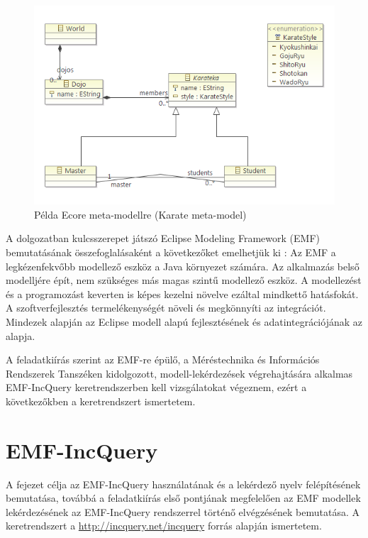 \begin{figure}[h]
\centering
\includegraphics[width=\textwidth]{figures/ecore-karate-metamodel-diag.png}
\caption{Példa Ecore meta-modellre (Karate meta-model)}
\label{fig:EcoreKarateMetaModel}
\end{figure}

A dolgozatban kulcsszerepet játszó Eclipse Modeling Framework (\gls{EMF}) bemutatásának összefoglalásaként a következőket emelhetjük ki \cite{EMFFundamentals}:
Az \gls{EMF} a legkézenfekvőbb modellező eszköz a Java környezet számára.
Az alkalmazás belső modelljére épít, nem szükséges más magas szintű modellező eszköz.
A modellezést és a programozást keverten is képes kezelni növelve ezáltal mindkettő hatásfokát.
A szoftverfejlesztés termelékenységét növeli és megkönnyíti az integrációt.
Mindezek alapján az Eclipse modell alapú fejlesztésének és adatintegrációjának az alapja. 

A feladatkiírás szerint az \gls{EMF}-re épülő, a Méréstechnika és Információs Rendszerek Tanszéken kidolgozott, modell-lekérdezések végrehajtására alkalmas EMF-IncQuery keretrendszerben kell vizsgálatokat végeznem, ezért a következőkben a keretrendszert ismertetem.


\section{EMF-IncQuery}

A fejezet célja az EMF-IncQuery használatának és a lekérdező nyelv felépítésének bemutatása, továbbá a feladatkiírás első pontjának megfelelően az EMF modellek lekérdezésének az EMF-IncQuery rendszerrel történő elvégzésének bemutatása.
A keretrendszert a \url{http://incquery.net/incquery} forrás alapján ismertetem.

